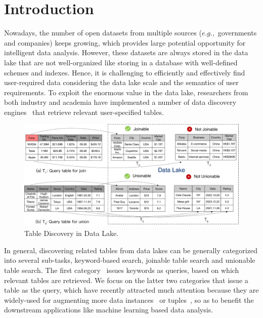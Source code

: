 
\section{Introduction}
 
Nowadays, the number of open datasets from multiple sources ($e.g.,$ governments and companies) keeps growing, which provides large potential opportunity for intelligent data analysis. However, these datasets are always stored in the data lake that are not well-organized like storing in a database with well-defined schemes and indexes. Hence, it is challenging to efficiently and effectively find user-required data considering the data lake scale and the semantics of user requirements.  
To exploit the enormous value in the data lake, researchers from both industry and academia have implemented a number of data discovery engines~\cite{} that retrieve relevant user-specified tables. 

\begin{figure}[h]
	\centering
	\includegraphics[width=0.8\linewidth]{fig/example.pdf}
	\caption{Table Discovery in Data Lake.}
	\label{fig:example}
\end{figure}




In general, discovering related tables from data lakes can be generally categorized into several sub-tasks, \eg keyword-based search, joinable table search and unionable table search.
The first category~\cite{} issues keywords as queries, based on which relevant tables are retrieved. 
We focus on the latter two categories that issue a table as the query, which have recently attracted much attention because they are widely-used for augmenting more data instances~\cite{} or tuples~\cite{}, so as to  benefit the downstream applications like machine learning based data analysis. 
%


